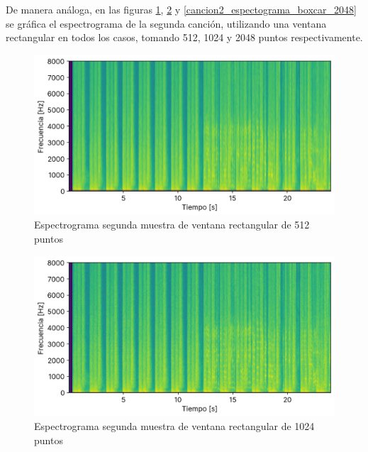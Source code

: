 \documentclass[12pt]{article}
\begin{document}
De manera análoga, en las figuras \ref{cancion2_espectograma_boxcar_0512}, \ref{cancion2_espectograma_boxcar_1024} y \ref{cancion2_espectograma_boxcar_2048} se gráfica el espectrograma de la segunda canción, utilizando una ventana rectangular en todos los casos, tomando 512, 1024 y 2048 puntos respectivamente.

\begin{figure}[H]
\centering
\includegraphics{plot/cancion2_espectograma_boxcar_0512.png}
\caption{Espectrograma segunda muestra de ventana rectangular de 512 puntos}
\label{cancion2_espectograma_boxcar_0512}
\end{figure}

\begin{figure}[H]
\centering
\includegraphics{plot/cancion2_espectograma_boxcar_1024.png}
\caption{Espectrograma segunda muestra de ventana rectangular de 1024 puntos}
\label{cancion2_espectograma_boxcar_1024}
\end{figure}
\end{document}
